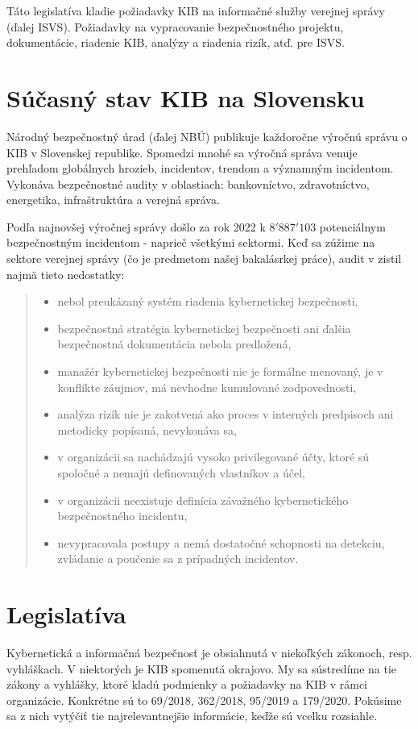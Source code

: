 Táto legislatíva kladie požiadavky KIB na informačné služby verejnej správy (ďalej ISVS). Požiadavky na 
vypracovanie bezpečnostného projektu, dokumentácie, riadenie KIB, analýzy a riadenia rizík, atď. pre ISVS. 

  \section{Súčasný stav KIB na Slovensku}
Národný bezpečnostný úrad (ďalej NBÚ) publikuje každoročne výročnú správu o KIB v Slovenskej republike. Spomedzi mnohé 
sa výročná správa venuje prehľadom globálnych hrozieb, incidentov, trendom a významným incidentom. Vykonáva bezpečnostné
audity v oblastiach: bankovníctvo, zdravotníctvo, energetika, infraštruktúra a verejná správa.

Podľa najnovšej výročnej správy \cite{KIBSK22} došlo za rok 2022 k $8'887'103$ potenciálnym bezpečnostným incidentom - naprieč všetkými sektormi. Keď sa zúžime na sektore verejnej správy (čo je predmetom našej bakalásrkej práce), audit v zistil
najmä tieto nedostatky: 

\begin{quote}
  \begin{itemize}
    \item nebol preukázaný systém riadenia kybernetickej bezpečnosti,
    \item bezpečnostná stratégia kybernetickej bezpečnosti ani ďalšia bezpečnostná dokumentácia nebola predložená,
    \item manažér kybernetickej bezpečnosti nie je formálne menovaný, je v konflikte záujmov, má nevhodne kumulované zodpovednosti,
    \item analýza rizík nie je zakotvená ako proces v interných predpisoch ani metodicky popísaná, nevykonáva sa,
    \item v organizácii sa nachádzajú vysoko privilegované účty, ktoré sú spoločné a nemajú definovaných vlastníkov a účel,
    \item v organizácii neexistuje definícia závažného kybernetického bezpečnostného incidentu,
    \item nevypracovala postupy a nemá dostatočné schopnosti na detekciu, zvládanie a poučenie sa z prípadných incidentov.
  \end{itemize}
\end{quote}

\section{Legislatíva}
Kybernetická a informačná bezpečnosť je obsiahnutá v niekoľkých zákonoch, resp. vyhláškach. V niektorých je KIB spomenutá okrajovo.
My sa sústredíme na tie zákony a vyhlášky, ktoré kladú podmienky a požiadavky na KIB v rámci organizácie. Konkrétne sú to 
69/2018\cite{69/2018}, 362/2018\cite{362/2018}, 95/2019\cite{95/2019} a 179/2020\cite{179/2020}. Pokúsime sa z nich vytýčiť
tie najrelevantnejšie informácie, keďže sú vcelku rozsiahle.

